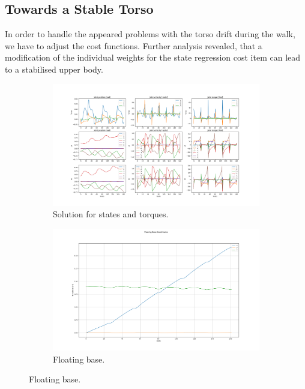 \subsection{Towards a Stable Torso}
In order to handle the appeared problems with the torso drift during the walk, we have to adjust the cost functions. Further analysis revealed, that a modification of the individual weights for the state regression cost item can lead to a stabilised upper body.
\begin{figure}[h!]
\begin{subfigure}{.5\textwidth}
 	 \centering
	 \includegraphics[width=1\linewidth]{Media/Crocoddyl/RH5Torso/FixTorsoFalling/RH5TorsoGait_FixFalling_Solution.png}
 	 \caption{Solution for states and torques.}
\end{subfigure}
\hfill
\begin{subfigure}{.5\textwidth}
  	\centering
  	\includegraphics[width=1\linewidth]{Media/Crocoddyl/RH5Torso/FixTorsoFalling/RH5TorsoGait_FixFalling_BaseCoord.png}
  	\caption{Floating base.}
\end{subfigure}

\end{figure}
